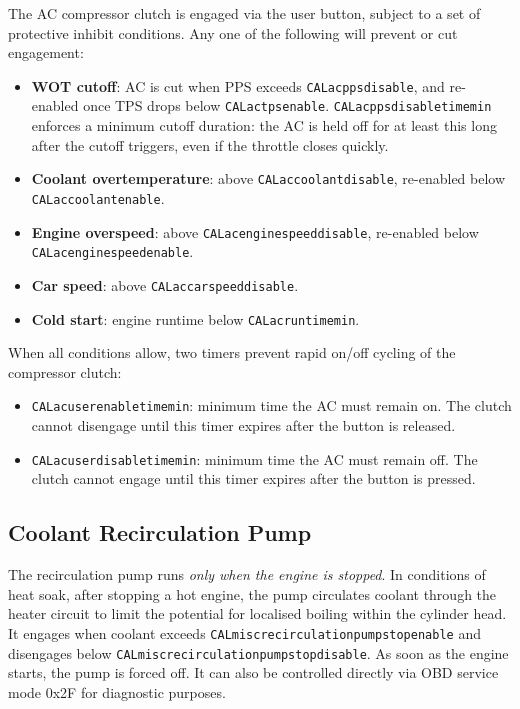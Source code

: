\documentclass[a4paper,11pt]{article}
\renewcommand{\_}{\oldunderscore\allowbreak}
\begin{document}
The AC compressor clutch is engaged via the user button, subject to a set of
protective inhibit conditions. Any one of the following will prevent or cut
engagement:

\begin{itemize}
\item \textbf{WOT cutoff}: AC is cut when PPS exceeds
      \texttt{CAL\_ac\_pps\_disable}, and re-enabled once TPS drops below
      \texttt{CAL\_ac\_tps\_enable}. \texttt{CAL\_ac\_pps\_disable\_time\_min}
      enforces a minimum cutoff duration: the AC is held off for at least this
      long after the cutoff triggers, even if the throttle closes quickly.
\item \textbf{Coolant overtemperature}: above \texttt{CAL\_ac\_coolant\_disable},
      re-enabled below \texttt{CAL\_ac\_coolant\_enable}.
\item \textbf{Engine overspeed}: above \texttt{CAL\_ac\_engine\_speed\_disable},
      re-enabled below \texttt{CAL\_ac\_engine\_speed\_enable}.
\item \textbf{Car speed}: above \texttt{CAL\_ac\_car\_speed\_disable}.
\item \textbf{Cold start}: engine runtime below \texttt{CAL\_ac\_runtime\_min}.
\end{itemize}

When all conditions allow, two timers prevent rapid on/off cycling of the
compressor clutch:
\begin{itemize}
\item \texttt{CAL\_ac\_user\_enable\_time\_min}: minimum time the AC must
      remain on. The clutch cannot disengage until this timer expires after
      the button is released.
\item \texttt{CAL\_ac\_user\_disable\_time\_min}: minimum time the AC must
      remain off. The clutch cannot engage until this timer expires after
      the button is pressed.
\end{itemize}

\subsection{Coolant Recirculation Pump}

The recirculation pump runs \emph{only when the engine is stopped}. In conditions
of heat soak, after stopping a hot engine, the pump circulates coolant through
the heater circuit to limit the potential for localised boiling within the
cylinder head. It engages
when coolant exceeds \texttt{CAL\_misc\_recirculation\_pump\_stop\_enable} and
disengages below \texttt{CAL\_misc\_recirculation\_pump\_stop\_disable}. As soon
as the engine starts, the pump is forced off. It can also be controlled directly
via OBD service mode 0x2F for diagnostic purposes.
\end{document}
